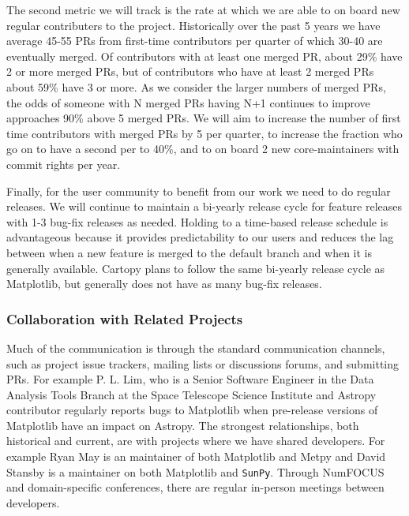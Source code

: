 \documentclass[12pt]{article}
\numberwithin{page}{section}
\begin{document}
The second metric we will track is the rate at which we are able to on board
new regular contributers to the project.  Historically over the past 5 years we
have average 45-55 PRs from first-time contributors per quarter of which 30-40
are eventually merged.  Of contributors with at least one merged PR, about 29\%
have 2 or more merged PRs, but of contributors who have at least 2 merged PRs
about 59\% have 3 or more.  As we consider the larger numbers of merged PRs,
the odds of someone with N merged PRs having N+1 continues to improve
approaches 90\% above 5 merged PRs.  We will aim to increase the number of
first time contributors with merged PRs by 5 per quarter, to increase the
fraction who go on to have a second per to 40\%, and to on board 2 new
core-maintainers with commit rights per year.

Finally, for the user community to benefit from our work we need to do
regular releases.  We will continue to maintain a bi-yearly release
cycle for feature releases with 1-3 bug-fix releases as needed.
Holding to a time-based release schedule is advantageous because it
provides predictability to our users and reduces the lag between when a
new feature is merged to the default branch and when it is generally
available. Cartopy plans to follow the same bi-yearly release cycle as Matplotlib, but
generally does not have as many bug-fix releases.

\subsubsection{Collaboration with Related Projects}


Much of the communication is through the standard communication channels, such
as project issue trackers, mailing lists or discussions forums, and submitting
PRs.  For example P. L. Lim, who is a Senior Software Engineer in the Data
Analysis Tools Branch at the Space Telescope Science Institute and Astropy
contributor regularly reports bugs to Matplotlib when pre-release versions of
Matplotlib have an impact on Astropy.  The strongest relationships, both
historical and current, are with projects where we have shared developers.
For example Ryan May is an maintainer of both Matplotlib and Metpy and David
Stansby is a maintainer on both Matplotlib and \texttt{SunPy}.  Through NumFOCUS
and domain-specific conferences, there are regular in-person meetings between
developers.
\end{document}

